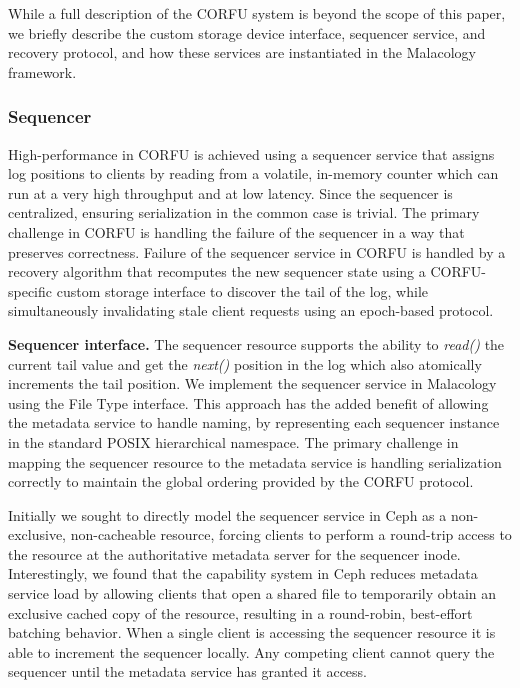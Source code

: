 While a full description of the CORFU system is beyond the scope of this paper,
we briefly describe the custom storage device interface, sequencer service, and
recovery protocol, and how these services are instantiated in the Malacology
framework.

\subsubsection{Sequencer}
\label{sec:seq}

High-performance in CORFU is achieved using a sequencer service that assigns
log positions to clients by reading from a volatile, in-memory counter which
can run at a very high throughput and at low latency. Since the sequencer is
centralized, ensuring serialization in the common case is trivial.  The
primary challenge in CORFU is handling the failure of the sequencer in a way
that preserves correctness. Failure of the sequencer service in CORFU is
handled by a recovery algorithm that recomputes the new sequencer state using a
CORFU-specific custom storage interface to discover the tail of the log, while
simultaneously invalidating stale client requests using an epoch-based
protocol.

{\bf Sequencer interface.} The sequencer resource supports the ability to
\emph{read()} the current tail value and get the \emph{next()} position in the
log which also atomically increments the tail position.  We implement the
sequencer service in Malacology using the File Type interface.
This approach has the added benefit of allowing the metadata
service to handle naming, by representing each sequencer instance in the
standard POSIX hierarchical namespace. The primary challenge in mapping the
sequencer resource to the metadata service is handling serialization correctly
to maintain the global ordering provided by the CORFU protocol.

Initially we sought to directly model the sequencer service in Ceph as a
non-exclusive, non-cacheable resource, forcing clients to perform a round-trip
access to the resource at the authoritative metadata server for the sequencer
inode.  Interestingly, we found that the capability system in Ceph 
reduces metadata service load by allowing clients that open a shared
file to temporarily obtain an exclusive cached copy of the resource, resulting
in a round-robin, best-effort batching behavior. When a single client is
accessing the sequencer resource it is able to increment the sequencer locally.
Any competing client cannot query the sequencer until the metadata service has
granted it access.

